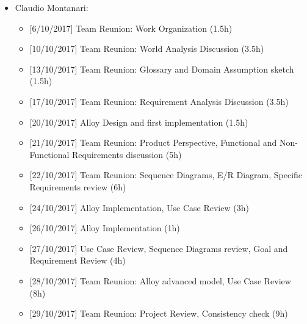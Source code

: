 \begin{itemize}
   \item Claudio Montanari:
      \begin{itemize}
      \item {[}6/10/2017{]} Team Reunion: Work Organization (1.5h)
      \item {[}10/10/2017{]} Team Reunion: World Analysis Discussion (3.5h)
      \item {[}13/10/2017{]} Team Reunion: Glossary and Domain Assumption sketch (1.5h)
      \item {[}17/10/2017{]} Team Reunion: Requirement Analysis Discussion (3.5h)
      \item {[}20/10/2017{]} Alloy Design and first implementation (1.5h)
      \item {[}21/10/2017{]} Team Reunion: Product Perspective, Functional and Non-Functional Requirements discussion (5h)
      \item {[}22/10/2017{]} Team Reunion: Sequence Diagrams, E/R Diagram, Specific Requirements review (6h)
      \item {[}24/10/2017{]} Alloy Implementation, Use Case Review  (3h)
      \item {[}26/10/2017{]} Alloy Implementation (1h)
      \item {[}27/10/2017{]} Use Case Review, Sequence Diagrams review, Goal and Requirement Review (4h)     
      \item {[}28/10/2017{]} Team Reunion: Alloy advanced model, Use Case Review (8h) 
      \item {[}29/10/2017{]} Team Reunion: Project Review, Consistency check (9h)
      \end{itemize}
      

\end{itemize}
